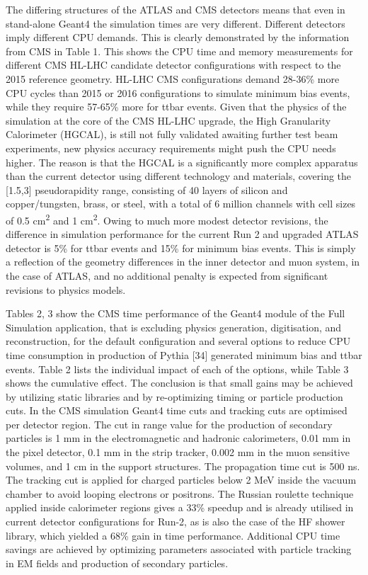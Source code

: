 \documentclass[12pt,a4paper]{article}
\begin{document}
The differing structures of the ATLAS and CMS detectors means that even
in stand-alone Geant4 the simulation times are very different. Different
detectors imply different CPU demands. This is clearly demonstrated by
the information from CMS in Table 1. This shows the CPU time and memory
measurements for different CMS HL-LHC candidate detector configurations
with respect to the 2015 reference geometry. HL-LHC CMS configurations
demand 28-36\% more CPU cycles than 2015 or 2016 configurations to
simulate minimum bias events, while they require 57-65\% more for ttbar
events. Given that the physics of the simulation at the core of the CMS
HL-LHC upgrade, the High Granularity Calorimeter (HGCAL), is still not
fully validated awaiting further test beam experiments, new physics
accuracy requirements might push the CPU needs higher. The reason is
that the HGCAL is a significantly more complex apparatus than the
current detector using different technology and materials, covering the
{[}1.5,3{]} pseudorapidity range, consisting of 40 layers of silicon and
copper/tungsten, brass, or steel, with a total of 6 million channels
with cell sizes of 0.5 cm\textsuperscript{2} and 1
cm\textsuperscript{2}. Owing to much more modest detector revisions, the
difference in simulation performance for the current Run 2 and upgraded
ATLAS detector is 5\% for ttbar events and 15\% for minimum bias events.
This is simply a reflection of the geometry differences in the inner
detector and muon system, in the case of ATLAS, and no additional
penalty is expected from significant revisions to physics models.

Tables 2, 3 show the CMS time performance of the Geant4 module of the
Full Simulation application, that is excluding physics generation,
digitisation, and reconstruction, for the default configuration and
several options to reduce CPU time consumption in production of Pythia
{[}34{]} generated minimum bias and ttbar events. Table 2 lists the
individual impact of each of the options, while Table 3 shows the
cumulative effect. The conclusion is that small gains may be achieved by
utilizing static libraries and by re-optimizing timing or particle
production cuts. In the CMS simulation Geant4 time cuts and tracking
cuts are optimised per detector region. The cut in range value for the
production of secondary particles is 1 mm in the electromagnetic and
hadronic calorimeters, 0.01 mm in the pixel detector, 0.1 mm in the
strip tracker, 0.002 mm in the muon sensitive volumes, and 1 cm in the
support structures. The propagation time cut is 500 ns. The tracking cut
is applied for charged particles below 2 MeV inside the vacuum chamber
to avoid looping electrons or positrons. The Russian roulette technique
applied inside calorimeter regions gives a 33\% speedup and is already
utilised in current detector configurations for Run-2, as is also the
case of the HF shower library, which yielded a 68\% gain in time
performance. Additional CPU time savings are achieved by optimizing
parameters associated with particle tracking in EM fields and production
of secondary particles.
\end{document}
